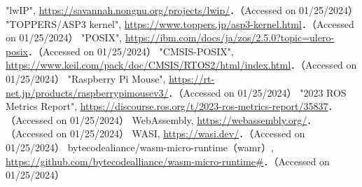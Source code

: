 \begin{thebibliography}{99}
 "lwIP", \url{https://savannah.nongnu.org/projects/lwip/}．（Accessed on 01/25/2024）
 "TOPPERS/ASP3 kernel", \url{https://www.toppers.jp/asp3-kernel.html}．（Accessed on 01/25/2024）
 "POSIX", \url{https://ibm.com/docs/ja/zos/2.5.0?topic=ulero-posix}．（Accessed on 01/25/2024）
 "CMSIS-POSIX", \url{https://www.keil.com/pack/doc/CMSIS/RTOS2/html/index.html}．（Accessed on 01/25/2024）
 "Raspberry Pi Mouse", \url{https://rt-net.jp/products/raspberrypimousev3/}．（Accessed on 01/25/2024）
 "2023 ROS Metrics Report", \url{https://discourse.ros.org/t/2023-ros-metrics-report/35837}．（Accessed on 01/25/2024）
 WebAssembly, \url{https://webassembly.org/}．（Accessed on 01/25/2024）
 WASI, \url{https://wasi.dev/}．（Accessed on 01/25/2024）
 bytecodealiance/wasm-micro-runtime（wamr）, \url{https://github.com/bytecodealliance/wasm-micro-runtime#}．（Accessed on 01/25/2024）
\end{thebibliography}